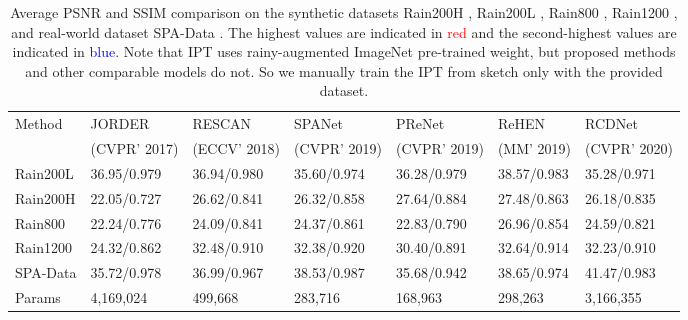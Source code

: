 \documentclass[a4paper,fleqn]{cas-dc}
\begin{document}
\begin{table*}[]
	\tabcolsep 0.06in{\scriptsize{}}
	\centering
	\caption{Average PSNR and SSIM comparison on the synthetic datasets Rain200H \cite{yang2017deep}, Rain200L \cite{yang2017deep}, Rain800 \cite{zhang2019image}, Rain1200 \cite{zhang2018density}, and real-world dataset SPA-Data \cite{wang2019spatial}. The highest values are indicated in \textcolor{red}{red} and the second-highest values are indicated in \textcolor{blue}{blue}. 
Note that IPT uses rainy-augmented ImageNet pre-trained weight, but proposed methods and other comparable models do not. So we manually train the IPT from sketch only with the provided dataset.}
	\vspace{0.15cm}
	{\small{
    \begin{tabular*}{\tblwidth}{@{}LLLLLLL@{}}		
		
		\toprule
		Method   & JORDER \cite{yang2017deep} & RESCAN \cite{li2018recurrent}   & SPANet \cite{wang2019spatial}  & PReNet \cite{ren2019progressive}    &  ReHEN \cite{yang2019single}    &  RCDNet \cite{wang2020model} \\
	    & (CVPR' 2017)  & (ECCV' 2018)  & (CVPR' 2019) & (CVPR' 2019) & (MM' 2019) & (CVPR' 2020)  \\ 
		\midrule
		Rain200L  & 36.95/0.979                & 36.94/0.980                     & 35.60/0.974                    & 36.28/0.979                         & {38.57/0.983 }          & 35.28/0.971      \\ 
		Rain200H  & 22.05/0.727                & 26.62/0.841                     & 26.32/0.858                    & 27.64/0.884                         & 27.48/0.863                             & 26.18/0.835         \\ 
		Rain800    & 22.24/0.776                & 24.09/0.841                     & 24.37/0.861                    & 22.83/0.790                         &{26.96/0.854}        & 24.59/0.821       \\
		Rain1200  & 24.32/0.862                & 32.48/0.910                     & 32.38/0.920                    & 30.40/0.891                         & {32.64/0.914}       & 32.23/0.910       \\ 
SPA-Data  & 35.72/0.978                & 36.99/0.967                     & 38.53/0.987                    & 35.68/0.942                         & 38.65/0.974          & {41.47/0.983}      \\ 
		Params & 4,169,024               & 499,668                     & 283,716                    & 168,963                         & 298,263          & 3,166,355      \\  


\end{tabular*}}}
\end{table*}
\end{document}
